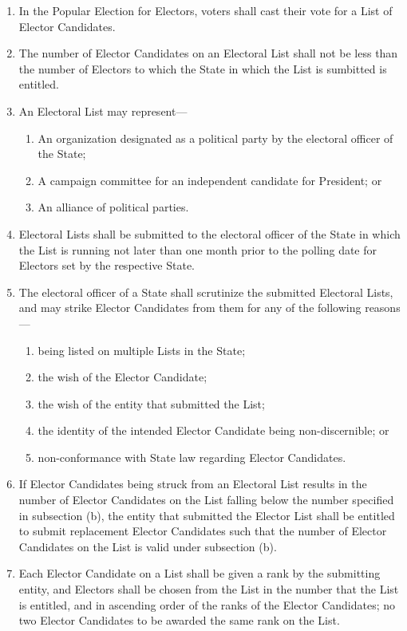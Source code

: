 \documentclass{article}
\begin{document}
    \begin{enumerate}
        \item In the Popular Election for Electors, voters shall cast their vote for a List of Elector Candidates.
        \item The number of Elector Candidates on an Electoral List shall not be less than the number of Electors to which the State in which the List is sumbitted is entitled.
        \item An Electoral List may represent---
        \begin{enumerate}
            \item An organization designated as a political party by the electoral officer of the State;
            \item A campaign committee for an independent candidate for President; or
            \item An alliance of political parties.
        \end{enumerate}
        \item Electoral Lists shall be submitted to the electoral officer of the State in which the List is running not later than one month prior to the polling date for Electors set by the respective State.
        \item The electoral officer of a State shall scrutinize the submitted Electoral Lists, and may strike Elector Candidates from them for any of the following reasons---
        \begin{enumerate}
            \item being listed on multiple Lists in the State;
            \item the wish of the Elector Candidate;
            \item the wish of the entity that submitted the List;
            \item the identity of the intended Elector Candidate being non-discernible; or
            \item non-conformance with State law regarding Elector Candidates.
        \end{enumerate}
        \item If Elector Candidates being struck from an Electoral List results in the number of Elector Candidates on the List falling below the number specified in subsection (b), the entity that submitted the Elector List shall be entitled to submit replacement Elector Candidates such that the number of Elector Candidates on the List is valid under subsection (b).
        \item Each Elector Candidate on a List shall be given a rank by the submitting entity, and Electors shall be chosen from the List in the number that the List is entitled, and in ascending order of the ranks of the Elector Candidates; no two Elector Candidates to be awarded the same rank on the List.

\end{enumerate}
\end{document}
